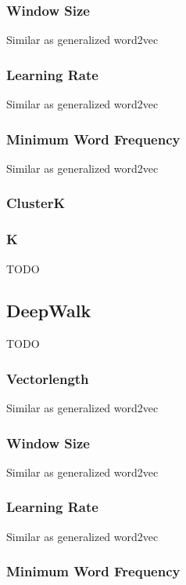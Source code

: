 \subsubsection*{Window Size}

Similar as generalized word2vec

\subsubsection*{Learning Rate}

Similar as generalized word2vec

\subsubsection*{Minimum Word Frequency}

Similar as generalized word2vec

\subsubsection*{ClusterK}

\subsubsection*{K}

TODO

\subsection{DeepWalk}

TODO

\subsubsection*{Vectorlength}

Similar as generalized word2vec

\subsubsection*{Window Size}

Similar as generalized word2vec

\subsubsection*{Learning Rate}

Similar as generalized word2vec

\subsubsection*{Minimum Word Frequency}

